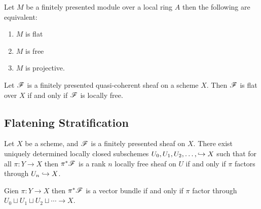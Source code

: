 \documentclass[12pt]{article}
\begin{document}
\begin{thm}
Let $M$ be a finitely presented module over a local ring $A$ then the following are equivalent:
\begin{enumerate}
\item $M$ is flat
\item $M$ is free
\item $M$ is projective.
\end{enumerate}
\end{thm}

\begin{cor}
Let $\mathscr{F}$ is a finitely presented quasi-coherent sheaf on a scheme $X$. Then $\mathscr{F}$ is flat over $X$ if and only if $\mathscr{F}$ is locally free.
\end{cor}

\subsection{Flatening Stratification}

\begin{thm}
Let $X$ be a scheme, and $\mathscr{F}$ is a finitely presented sheaf on $X$. There exist uniquely determined locally closed subschemes $U_0, U_1, U_2, \dots, \hookrightarrow X$ such that for all $\pi : Y \to X$ then $\pi^* \mathscr{F}$ is a rank $n$ locally free sheaf on $U$ if and only if $\pi$ factors through $U_n \hookrightarrow X$.
\end{thm}

\begin{cor}
Gien $\pi : Y \to X$ then $\pi^* \mathscr{F}$ is a vector bundle if and only if $\pi$ factor through $U_0 \sqcup U_1 \sqcup U_2 \sqcup \cdots \to X$. 
\end{cor}
\end{document}
